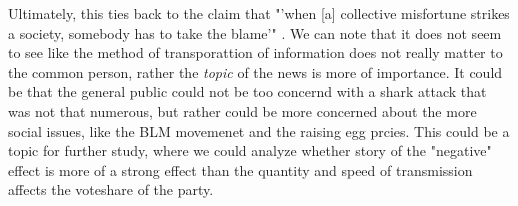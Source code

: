 \documentclass[12pt]{article}
\begin{document}
Ultimately, this ties back to the claim that "'when [a] collective misfortune strikes a society, somebody has to take the blame'" \cite{article1}. We can note that it does not seem to see like the method of transporattion of information does not really matter to the common person, rather the \emph{topic} of the news is more of importance. It could be that the general public could not be too concernd with a shark attack that was not that numerous, but rather could be more concerned about the more social issues, like the BLM movemenet and the raising egg prcies. This could be a topic for further study, where we could analyze whether story of the "negative" effect is more of a strong effect than the quantity and speed of transmission affects the voteshare of the party. 


\newpage


\end{document}

